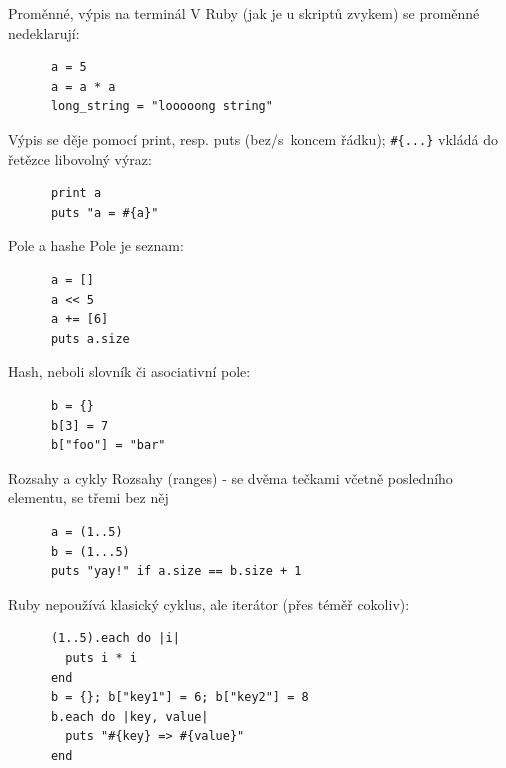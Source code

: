 \documentclass{beamer}
\begin{document}
\begin{frame}[fragile]{Proměnné, výpis na terminál}
  V Ruby (jak je u skriptů zvykem) se proměnné nedeklarují:
  \begin{block}{}
    {\scriptsize \begin{verbatim}
      a = 5
      a = a * a
      long_string = "looooong string"
    \end{verbatim}}
  \end{block}
  \pause
  Výpis se děje pomocí print, resp. puts (bez/s~koncem řádku); \texttt{\#\{...\}} vkládá do řetězce libovolný výraz:
  \begin{block}{}
    {\scriptsize \begin{verbatim}
      print a
      puts "a = #{a}"
    \end{verbatim}}
  \end{block}
\end{frame}

\begin{frame}[fragile]{Pole a hashe}
  Pole je seznam:
  \begin{block}{}
    {\scriptsize \begin{verbatim}
      a = []
      a << 5
      a += [6]
      puts a.size
    \end{verbatim}}
  \end{block}
  \pause
  Hash, neboli slovník či asociativní pole:
  \begin{block}{}
    {\scriptsize \begin{verbatim}
      b = {}
      b[3] = 7
      b["foo"] = "bar"
    \end{verbatim}}
  \end{block}
\end{frame}

\begin{frame}[fragile]{Rozsahy a cykly}
  Rozsahy (ranges) - se dvěma tečkami včetně posledního elementu, se třemi bez něj
  \begin{block}{}
    {\scriptsize \begin{verbatim}
      a = (1..5)
      b = (1...5)
      puts "yay!" if a.size == b.size + 1
    \end{verbatim}}
  \end{block}
  \pause
  Ruby nepoužívá klasický cyklus, ale iterátor (přes téměř cokoliv):
  \begin{block}{}
    {\scriptsize \begin{verbatim}
      (1..5).each do |i|
        puts i * i
      end
      b = {}; b["key1"] = 6; b["key2"] = 8
      b.each do |key, value|
        puts "#{key} => #{value}"
      end
    \end{verbatim}}
  \end{block}
\end{frame}
\end{document}
